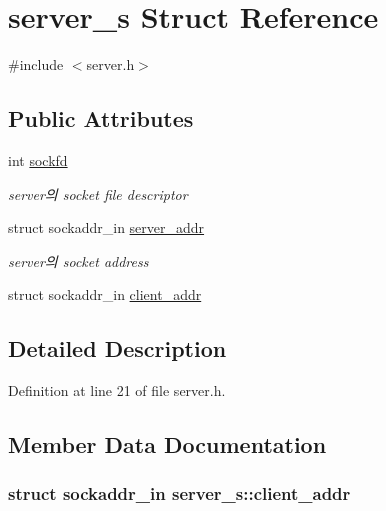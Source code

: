\hypertarget{structserver__s}{\section{server\-\_\-s Struct Reference}
\label{structserver__s}
}


{\ttfamily \#include $<$server.\-h$>$}

\subsection*{Public Attributes}
\begin{DoxyCompactItemize}
\item 
int \hyperlink{structserver__s_a7109ed4db0376f7de840d82c4379099d}{sockfd}
\begin{DoxyCompactList}\small\item\em server의 socket file descriptor \end{DoxyCompactList}\item 
struct sockaddr\-\_\-in \hyperlink{structserver__s_aa49ed3594b99b1da4de179995dfa553d}{server\-\_\-addr}
\begin{DoxyCompactList}\small\item\em server의 socket address \end{DoxyCompactList}\item 
struct sockaddr\-\_\-in \hyperlink{structserver__s_a542d49f8aee930024091c320530d8dbf}{client\-\_\-addr}
\end{DoxyCompactItemize}


\subsection{Detailed Description}


Definition at line 21 of file server.\-h.



\subsection{Member Data Documentation}
\hypertarget{structserver__s_a542d49f8aee930024091c320530d8dbf}{
\subsubsection[{client\-\_\-addr}]{\setlength{\rightskip}{0pt plus 5cm}struct sockaddr\-\_\-in server\-\_\-s\-::client\-\_\-addr}}\label{structserver__s_a542d49f8aee930024091c320530d8dbf}



